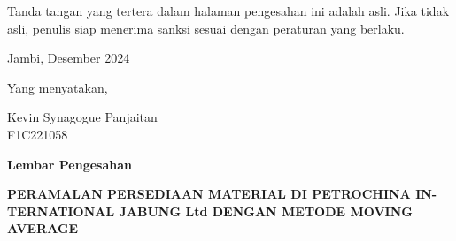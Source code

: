 \documentclass[12pt,calibri]{article}
\begin{document}
Tanda tangan yang tertera dalam halaman pengesahan ini adalah asli.
Jika tidak asli, penulis siap menerima sanksi sesuai dengan peraturan yang
berlaku.

\vspace*{40pt}
\begin{flushright}
    \small Jambi, Desember 2024
\end{flushright}
\begin{flushright}
    \small Yang menyatakan,
\end{flushright}
\vspace*{40PT}
\begin{flushright}
    \small {Kevin Synagogue Panjaitan}\\
  \normalfont \small  F1C221058
\end{flushright}

\newpage

\begin{center}
    \bfseries\Large Lembar Pengesahan
\end{center}

\begin{center}
    \bfseries \small PERAMALAN PERSEDIAAN MATERIAL DI PETROCHINA IN-
    TERNATIONAL JABUNG Ltd DENGAN METODE MOVING AVERAGE

\end{center}
\end{document}
